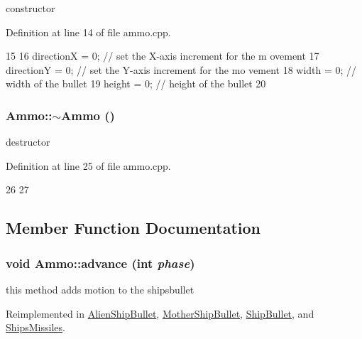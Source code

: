 constructor 

Definition at line 14 of file ammo.cpp.


\begin{DoxyCode}
15 {
16     directionX = 0;                         // set the X-axis increment for the m
      ovement
17     directionY = 0;                        // set the Y-axis increment for the mo
      vement
18     width = 0;                             // width of the bullet
19     height = 0;                            // height of the bullet
20 }
\end{DoxyCode}
\hypertarget{class_ammo_a90602c6481c6a66d4747306f90a3ebc7}{
\subsubsection[{$\sim$Ammo}]{\setlength{\rightskip}{0pt plus 5cm}Ammo::$\sim$Ammo ()}}
\label{class_ammo_a90602c6481c6a66d4747306f90a3ebc7}
destructor 

Definition at line 25 of file ammo.cpp.


\begin{DoxyCode}
26 {
27 }
\end{DoxyCode}


\subsection{Member Function Documentation}
\hypertarget{class_ammo_a257fb0cdbb4302da65b89447fa6caeaa}{
\subsubsection[{advance}]{\setlength{\rightskip}{0pt plus 5cm}void Ammo::advance (int {\em phase})}}
\label{class_ammo_a257fb0cdbb4302da65b89447fa6caeaa}
this method adds motion to the shipsbullet 

Reimplemented in \hyperlink{class_alien_ship_bullet_a29af8ac3011d72e8b845019e76ab203d}{AlienShipBullet}, \hyperlink{class_mother_ship_bullet_a56d988809fe0613e31c09bfb73d3ba0e}{MotherShipBullet}, \hyperlink{class_ship_bullet_ad2b81da446941edb9ec54a7603ed1212}{ShipBullet}, and \hyperlink{class_ships_missiles_a5ce92a82b6f1259319e92379ab4ee306}{ShipsMissiles}.

